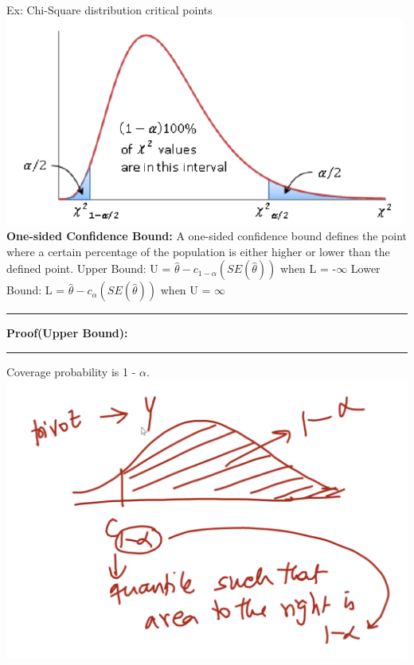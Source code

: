 \documentclass[]{article}
\begin{document}
\newline\newline Ex: Chi-Square distribution critical points
\newline\includegraphics[scale=0.6]{assymetric_ci}
\newline
\newline
\newline
\newline
\newline
\Large\textbf{One-sided Confidence Bound:}
\newline A one-sided confidence bound defines the point where a certain percentage of the population is either higher or lower than the defined point.
\newline
\newline Upper Bound: U = $\hat\theta - c_{1- \alpha }(SE(\hat\theta))$ when  L = -$\infty$
\newline
\newline Lower Bound: L = $\hat\theta - c_{\alpha }(SE(\hat\theta))$ when  U = $\infty$
\newline
\newline\Large\rule{3.0cm}{0pt} \textbf{Proof(Upper Bound):}
\newline\Large\rule{3.0cm}{0pt} Coverage probability is 1 - $\alpha$.
\newline
\includegraphics[scale=0.47]{one_sided_ci}
\end{document}
